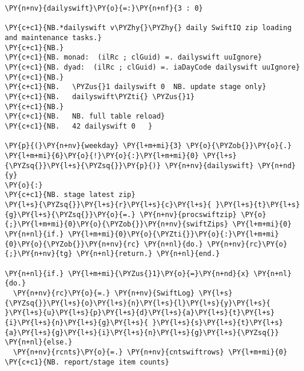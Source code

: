     \begin{tcolorbox}[breakable, size=fbox, boxrule=1pt, pad at break*=1mm,colback=cellbackground, colframe=cellborder]
\begin{Verbatim}[commandchars=\\\{\}]
\PY{n+nv}{dailyswift}\PY{o}{=:}\PY{n+nf}{3 : 0}

\PY{c+c1}{NB.*dailyswift v\PYZhy{}\PYZhy{} daily SwiftIQ zip loading and maintenance tasks.}
\PY{c+c1}{NB.}
\PY{c+c1}{NB. monad:  (ilRc ; clGuid) =. dailyswift uuIgnore}
\PY{c+c1}{NB. dyad:  (ilRc ; clGuid) =. iaDayCode dailyswift uuIgnore}
\PY{c+c1}{NB.}
\PY{c+c1}{NB.   \PYZus{}1 dailyswift 0  NB. update stage only}
\PY{c+c1}{NB.   dailyswift\PYZti{} \PYZus{}1}
\PY{c+c1}{NB.}
\PY{c+c1}{NB.   NB. full table reload}
\PY{c+c1}{NB.   42 dailyswift 0   }

\PY{p}{(}\PY{n+nv}{weekday} \PY{l+m+mi}{3} \PY{o}{\PYZob{}}\PY{o}{.} \PY{l+m+mi}{6}\PY{o}{!}\PY{o}{:}\PY{l+m+mi}{0} \PY{l+s}{\PYZsq{}}\PY{l+s}{\PYZsq{}}\PY{p}{)} \PY{n+nv}{dailyswift} \PY{n+nd}{y}
\PY{o}{:}
\PY{c+c1}{NB. stage latest zip}
\PY{l+s}{\PYZsq{}}\PY{l+s}{r}\PY{l+s}{c}\PY{l+s}{ }\PY{l+s}{t}\PY{l+s}{g}\PY{l+s}{\PYZsq{}}\PY{o}{=.} \PY{n+nv}{procswiftzip} \PY{o}{;}\PY{l+m+mi}{0}\PY{o}{\PYZob{}}\PY{n+nv}{swiftZips} \PY{l+m+mi}{0}
\PY{n+nl}{if.} \PY{l+m+mi}{0}\PY{o}{\PYZti{}}\PY{o}{:}\PY{l+m+mi}{0}\PY{o}{\PYZob{}}\PY{n+nv}{rc} \PY{n+nl}{do.} \PY{n+nv}{rc}\PY{o}{;}\PY{n+nv}{tg} \PY{n+nl}{return.} \PY{n+nl}{end.}

\PY{n+nl}{if.} \PY{l+m+mi}{\PYZus{}1}\PY{o}{=}\PY{n+nd}{x} \PY{n+nl}{do.}
  \PY{n+nv}{rc}\PY{o}{=.} \PY{n+nv}{SwiftLog} \PY{l+s}{\PYZsq{}}\PY{l+s}{o}\PY{l+s}{n}\PY{l+s}{l}\PY{l+s}{y}\PY{l+s}{ }\PY{l+s}{u}\PY{l+s}{p}\PY{l+s}{d}\PY{l+s}{a}\PY{l+s}{t}\PY{l+s}{i}\PY{l+s}{n}\PY{l+s}{g}\PY{l+s}{ }\PY{l+s}{s}\PY{l+s}{t}\PY{l+s}{a}\PY{l+s}{g}\PY{l+s}{i}\PY{l+s}{n}\PY{l+s}{g}\PY{l+s}{\PYZsq{}}
\PY{n+nl}{else.}
  \PY{n+nv}{rcnts}\PY{o}{=.} \PY{n+nv}{cntswiftrows} \PY{l+m+mi}{0}  \PY{c+c1}{NB. report/stage item counts}


\end{Verbatim}
\end{tcolorbox}
